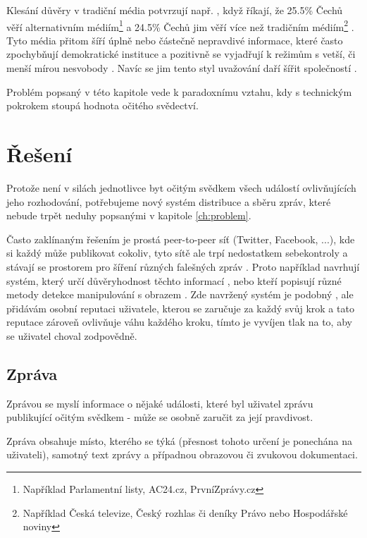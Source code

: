 \documentclass[a4papper]{article}
\begin{document}
Klesání důvěry v tradiční média potvrzují např. \citeauthor{janda16b}, když říkají, že 25.5\% Čechů věří alternativním médiím\footnote{Například Parlamentní listy, AC24.cz, PrvníZprávy.cz} a 24.5\% Čechů jim věří více než tradičním médiím\footnote{Například Česká televize, Český rozhlas či deníky Právo nebo Hospodářské noviny} \citep{janda16b}. Tyto média přitom šíří úplně nebo částečně nepravdivé informace, které často zpochybňují demokratické instituce a pozitivně se vyjadřují k režimům s vetší, či menší mírou nesvobody \citep{janda16a}. Navíc se jim tento styl uvažování daří šířit společností \citep{janda16b}.

Problém popsaný v této kapitole vede k paradoxnímu vztahu, kdy s technickým pokrokem stoupá hodnota očitého svědectví.

\section{Řešení}
\label{ch:reseni}

Protože není v silách jednotlivce byt očitým svědkem všech událostí ovlivňujících jeho rozhodování, potřebujeme nový systém distribuce a sběru zpráv, které nebude trpět neduhy popsanými v kapitole \ref{ch:problem}.

Často zaklínaným řešením je prostá peer-to-peer síť (Twitter, Facebook, ...), kde si každý může publikovat cokoliv, tyto sítě ale trpí nedostatkem sebekontroly a stávají se prostorem pro šíření různých falešných zpráv \citep{netanel01}. Proto například \citeauthor{giasemidis16} navrhují systém, který určí důvěryhodnost těchto informací \citep{giasemidis16}, nebo \citeauthor{mishra13} kteří popisují různé metody detekce manipulování s obrazem \citep{mishra13}. Zde navržený systém je podobný \citeauthor{dragoni13}, ale přidávám osobní reputaci uživatele, kterou se zaručuje za každý svůj krok a tato reputace zároveň ovlivňuje váhu každého kroku, tímto je vyvíjen tlak na to, aby se uživatel choval zodpovědně.

\subsection{Zpráva}
\label{sec:zprava}

Zprávou se myslí informace o nějaké události, které byl uživatel zprávu publikující očitým svědkem - může se osobně zaručit za její pravdivost.

Zpráva obsahuje místo, kterého se týká (přesnost tohoto určení je ponechána na uživateli), samotný text zprávy a případnou obrazovou či zvukovou dokumentaci.
\end{document}
